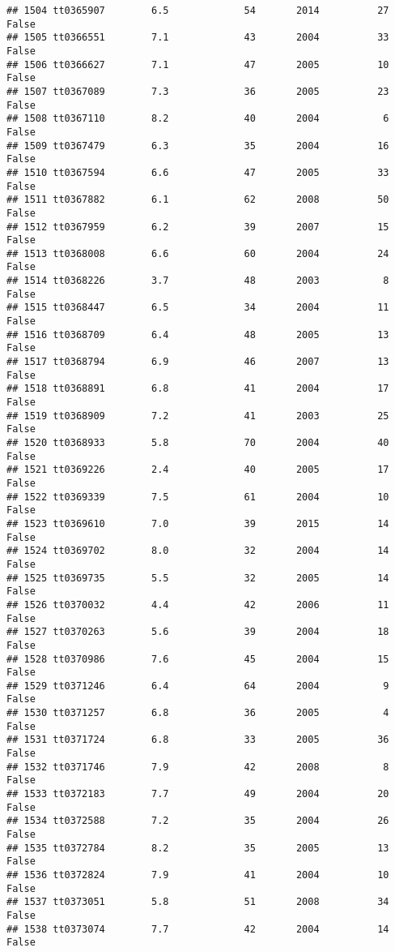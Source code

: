 \documentclass[
]{article}
\begin{document}
\begin{verbatim}
## 1504 tt0365907        6.5             54       2014          27   False
## 1505 tt0366551        7.1             43       2004          33   False
## 1506 tt0366627        7.1             47       2005          10   False
## 1507 tt0367089        7.3             36       2005          23   False
## 1508 tt0367110        8.2             40       2004           6   False
## 1509 tt0367479        6.3             35       2004          16   False
## 1510 tt0367594        6.6             47       2005          33   False
## 1511 tt0367882        6.1             62       2008          50   False
## 1512 tt0367959        6.2             39       2007          15   False
## 1513 tt0368008        6.6             60       2004          24   False
## 1514 tt0368226        3.7             48       2003           8   False
## 1515 tt0368447        6.5             34       2004          11   False
## 1516 tt0368709        6.4             48       2005          13   False
## 1517 tt0368794        6.9             46       2007          13   False
## 1518 tt0368891        6.8             41       2004          17   False
## 1519 tt0368909        7.2             41       2003          25   False
## 1520 tt0368933        5.8             70       2004          40   False
## 1521 tt0369226        2.4             40       2005          17   False
## 1522 tt0369339        7.5             61       2004          10   False
## 1523 tt0369610        7.0             39       2015          14   False
## 1524 tt0369702        8.0             32       2004          14   False
## 1525 tt0369735        5.5             32       2005          14   False
## 1526 tt0370032        4.4             42       2006          11   False
## 1527 tt0370263        5.6             39       2004          18   False
## 1528 tt0370986        7.6             45       2004          15   False
## 1529 tt0371246        6.4             64       2004           9   False
## 1530 tt0371257        6.8             36       2005           4   False
## 1531 tt0371724        6.8             33       2005          36   False
## 1532 tt0371746        7.9             42       2008           8   False
## 1533 tt0372183        7.7             49       2004          20   False
## 1534 tt0372588        7.2             35       2004          26   False
## 1535 tt0372784        8.2             35       2005          13   False
## 1536 tt0372824        7.9             41       2004          10   False
## 1537 tt0373051        5.8             51       2008          34   False
## 1538 tt0373074        7.7             42       2004          14   False

\end{verbatim}
\end{document}
